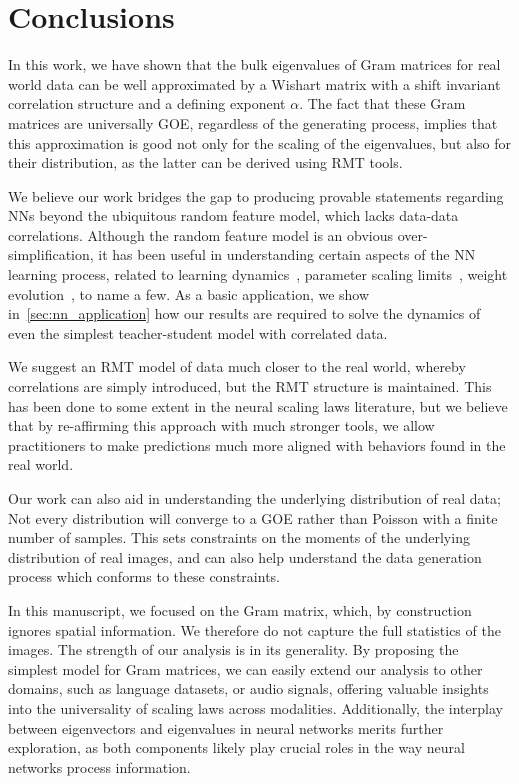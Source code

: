 \documentclass{article}
\begin{document}
\section{Conclusions}
\label{sec:conclusions}
In this work, we have shown that the bulk eigenvalues of Gram matrices for real world data can be well approximated by a Wishart matrix with a shift invariant correlation structure and a defining exponent $\alpha$. 
The fact that these Gram matrices are universally GOE, regardless of the generating process, implies that this approximation is good not only for the scaling of the eigenvalues, but also for their distribution, as the latter can be derived using RMT tools.

We believe our work bridges the gap to producing provable statements regarding NNs beyond the ubiquitous random feature model, which lacks data-data correlations. Although the random feature model is an obvious over-simplification, it has been useful in understanding certain aspects of the NN learning process, related to learning dynamics~\citep{Gerace_2021,mei2020generalization,d2020double}, parameter scaling limits~\citep{maloney2022solvable}, weight evolution~\citep{arous2018landscape}, 
to name a few.  
As a basic application, we show in~\cref{sec:nn_application} how our results are required to solve the dynamics of even the simplest teacher-student model with correlated data.  

We suggest an RMT model of data much closer to the real world, whereby correlations are simply introduced, but the RMT structure is maintained. This has been done to some extent in the neural scaling laws literature, but we believe that by re-affirming this approach with much stronger tools, we allow practitioners to make predictions much more aligned with behaviors found in the real world. 

Our work can also aid in understanding the underlying distribution of real data; Not every distribution will converge to a GOE rather than Poisson with a finite number of samples. This sets constraints on the moments of the underlying distribution of real images, and can also help understand the data generation process which conforms to these constraints.

In this manuscript, we focused on the Gram matrix, which, by construction ignores spatial information. We therefore do not capture the full statistics of the images.
The strength of our analysis is in its generality. By proposing the simplest model for Gram matrices, we can easily extend our analysis to other domains, such as language datasets, or audio signals, offering valuable insights into the universality of scaling laws across modalities. Additionally, the interplay between eigenvectors and eigenvalues in neural networks merits further exploration, as both components likely play crucial roles in the way neural networks process information. 
\end{document}

